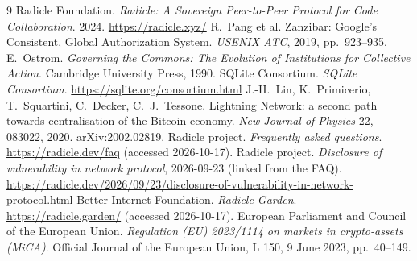 \documentclass[a4paper,11pt,twoside,parskip=half-,headings=small]{scrartcl}
\begin{document}
\begin{thebibliography}{9}
 Radicle Foundation. \emph{Radicle: A Sovereign Peer-to-Peer Protocol for Code Collaboration}. 2024. \url{https://radicle.xyz/}
 R.~Pang et al. Zanzibar: Google's Consistent, Global Authorization System. \emph{USENIX ATC}, 2019, pp.~923--935.
 E.~Ostrom. \emph{Governing the Commons: The Evolution of Institutions for Collective Action}. Cambridge University Press, 1990.
 SQLite Consortium. \emph{SQLite Consortium}. \url{https://sqlite.org/consortium.html}
 J.-H.~Lin, K.~Primicerio, T.~Squartini, C.~Decker, C.~J.~Tessone. Lightning Network: a second path towards centralisation of the Bitcoin economy. \emph{New Journal of Physics} 22, 083022, 2020. arXiv:2002.02819.
 Radicle project. \emph{Frequently asked questions}. \url{https://radicle.dev/faq} (accessed 2026-10-17).
 Radicle project. \emph{Disclosure of vulnerability in network protocol}, 2026-09-23 (linked from the FAQ). \url{https://radicle.dev/2026/09/23/disclosure-of-vulnerability-in-network-protocol.html}
 Better Internet Foundation. \emph{Radicle Garden}. \url{https://radicle.garden/} (accessed 2026-10-17).
 European Parliament and Council of the European Union. \emph{Regulation (EU) 2023/1114 on markets in crypto-assets (MiCA)}. Official Journal of the European Union, L 150, 9 June 2023, pp.~40--149.
\end{thebibliography}
\end{document}
